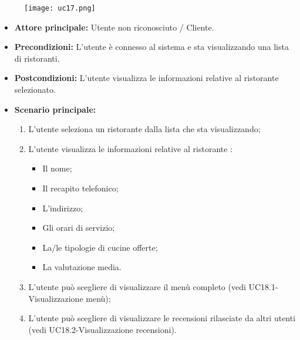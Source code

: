 \begin{figure}[h] \texttt{[image: uc17.png]} \end{figure}
\begin{itemize}
\item \textbf{Attore principale:} Utente non riconosciuto / Cliente.
\item \textbf{Precondizioni:} L'utente è connesso al sistema e sta visualizzando una lista di ristoranti.
\item \textbf{Postcondizioni:} L'utente visualizza le informazioni relative al ristorante selezionato.
\item \textbf{Scenario principale:}
\begin{enumerate}
    \item L'utente seleziona un ristorante dalla lista che sta visualizzando;
    \item L'utente visualizza le informazioni relative al ristorante :
    \begin{itemize}
        \item Il nome;
        \item Il recapito telefonico;
        \item L'indirizzo;
        \item Gli orari di servizio; %
        \item La/le tipologie di cucine offerte; %
        \item La valutazione media.
    \end{itemize}
    \item L'utente può scegliere di visualizzare il menù completo (vedi UC18.1-Visualizzazione menù);
    \item L'utente può scegliere di visualizzare le recensioni rilasciate da altri utenti (vedi UC18.2-Visualizzazione recensioni).
\end{enumerate}
\end{itemize}

